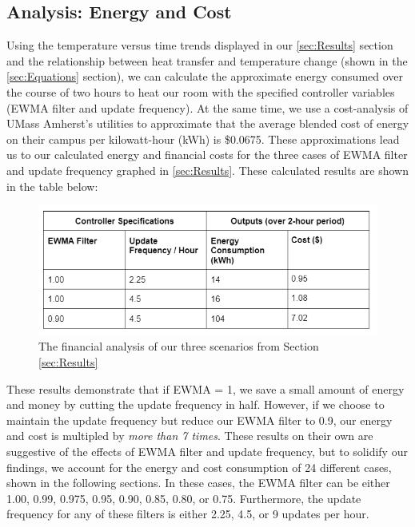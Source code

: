 \documentclass[conference,letterpaper]{IEEEtran}
\begin{document}
\subsection{Analysis: Energy and Cost}
\label{sec:Analysis}
Using the temperature versus time trends displayed in our \ref{sec:Results} section and the relationship between heat transfer and temperature change (shown in the \ref{sec:Equations} section), we can calculate the approximate energy consumed over the course of two hours to heat our room with the specified controller variables (EWMA filter and update frequency). At the same time, we use a cost-analysis of UMass Amherst's utilities to approximate that the average blended cost of energy on their campus per kilowatt-hour (kWh) is \$0.0675. These approximations lead us to our calculated energy and financial costs for the three cases of EWMA filter and update frequency graphed in \ref{sec:Results}. These calculated results are shown in the table below:
\begin{figure}[H]
    \includegraphics[scale=0.64]{analysis.png}
    \caption{The financial analysis of our three scenarios from Section \ref{sec:Results}}
\end{figure}

These results demonstrate that if EWMA = 1, we save a small amount of energy and money by cutting the update frequency in half. However, if we choose to maintain the update frequency but reduce our EWMA filter to 0.9, our energy and cost is multipled by \textit{more than 7 times}. These results on their own are suggestive of the effects of EWMA filter and update frequency, but to solidify our findings, we account for the energy and cost consumption of 24 different cases, shown in the following sections. In these cases, the EWMA filter can be either 1.00, 0.99, 0.975, 0.95, 0.90, 0.85, 0.80, or 0.75. Furthermore, the update frequency for any of these filters is either 2.25, 4.5, or 9 updates per hour.
\end{document}
